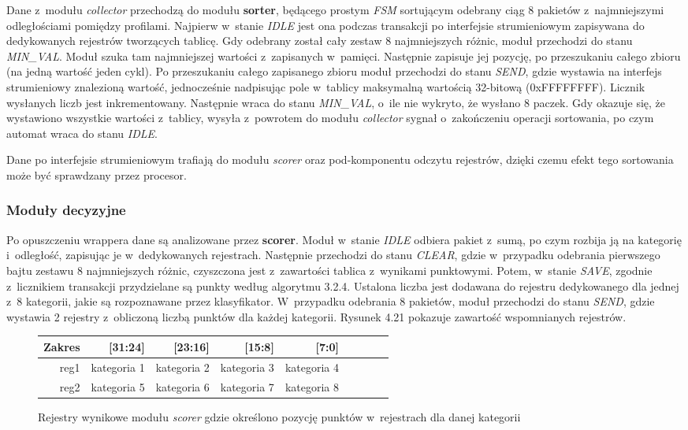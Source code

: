Dane z~modułu \textit{collector} przechodzą do modułu \textbf{sorter}, będącego prostym \textit{FSM} sortującym odebrany ciąg 8 pakietów z~najmniejszymi odległościami pomiędzy profilami. Najpierw w~stanie \textit{IDLE} jest ona podczas transakcji po interfejsie strumieniowym zapisywana do dedykowanych rejestrów tworzących tablicę. Gdy odebrany został cały zestaw 8 najmniejszych różnic, moduł przechodzi do stanu \textit{MIN\_VAL}. Moduł szuka tam najmniejszej wartości z~zapisanych w~pamięci. Następnie zapisuje jej pozycję, po przeszukaniu całego zbioru (na jedną wartość jeden cykl). Po przeszukaniu całego zapisanego zbioru moduł przechodzi do stanu \textit{SEND}, gdzie wystawia na interfejs strumieniowy znalezioną wartość, jednocześnie nadpisując pole w~tablicy maksymalną wartością 32-bitową (0xFFFFFFFF). Licznik wysłanych liczb jest inkrementowany. Następnie wraca do stanu \textit{MIN\_VAL}, o~ile nie wykryto, że wysłano 8 paczek. Gdy okazuje się, że wystawiono wszystkie wartości z~tablicy, wysyła z~powrotem do modułu \textit{collector} sygnał o~zakończeniu operacji sortowania, po czym automat wraca do stanu \textit{IDLE}.

Dane po interfejsie strumieniowym trafiają do modułu \textit{scorer} oraz pod-komponentu odczytu rejestrów, dzięki czemu efekt tego sortowania może być sprawdzany przez procesor.

\subsubsection{Moduły decyzyjne}

Po opuszczeniu wrappera dane są analizowane przez \textbf{scorer}. Moduł w~stanie \textit{IDLE} odbiera pakiet z~sumą, po czym rozbija ją na kategorię i~odległość, zapisując je w~dedykowanych rejestrach. Następnie przechodzi do stanu \textit{CLEAR}, gdzie w~przypadku odebrania pierwszego bajtu zestawu 8 najmniejszych różnic, czyszczona jest z~zawartości tablica z~wynikami punktowymi. Potem, w~stanie \textit{SAVE}, zgodnie z~licznikiem transakcji przydzielane są punkty według algorytmu 3.2.4. Ustalona liczba jest dodawana do rejestru dedykowanego dla jednej z~8 kategorii, jakie są rozpoznawane przez klasyfikator. W~przypadku odebrania 8 pakietów, moduł przechodzi do stanu \textit{SEND}, gdzie wystawia 2 rejestry z~obliczoną liczbą punktów dla każdej kategorii. Rysunek 4.21 pokazuje zawartość wspomnianych rejestrów.

 \begin{figure}[h]
 	\centering
 	\begin{tabular}{|r|r|r|r|r|r|r|r|r|}
 		\hline
 		Zakres & [31:24]& [23:16]& [15:8] & [7:0]\\
 		\hline
 		reg1 &  kategoria 1 & kategoria 2 & kategoria 3 & kategoria 4 \\
 		\hline
 		reg2 & kategoria 5 & kategoria 6 & kategoria 7 & kategoria 8 \\
 		\hline
 	\end{tabular}
 	
 	\caption{Rejestry wynikowe modułu \textit{scorer} gdzie określono pozycję punktów w~rejestrach dla danej kategorii}
 \end{figure}
 
